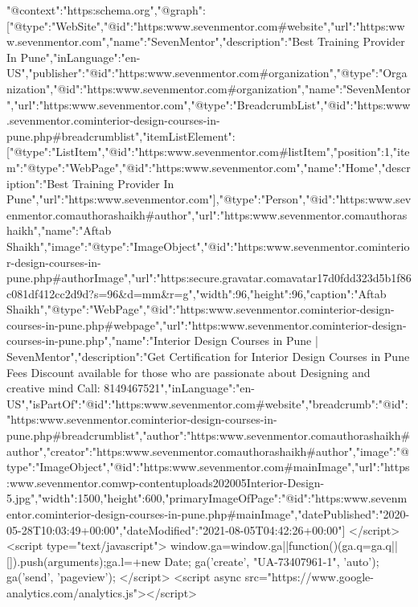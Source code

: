 			{"@context":"https:\/\/schema.org","@graph":[{"@type":"WebSite","@id":"https:\/\/www.sevenmentor.com\/#website","url":"https:\/\/www.sevenmentor.com\/","name":"SevenMentor","description":"Best Training Provider In Pune","inLanguage":"en-US","publisher":{"@id":"https:\/\/www.sevenmentor.com\/#organization"}},{"@type":"Organization","@id":"https:\/\/www.sevenmentor.com\/#organization","name":"SevenMentor","url":"https:\/\/www.sevenmentor.com\/"},{"@type":"BreadcrumbList","@id":"https:\/\/www.sevenmentor.com\/interior-design-courses-in-pune.php#breadcrumblist","itemListElement":[{"@type":"ListItem","@id":"https:\/\/www.sevenmentor.com\/#listItem","position":1,"item":{"@type":"WebPage","@id":"https:\/\/www.sevenmentor.com\/","name":"Home","description":"Best Training Provider In Pune","url":"https:\/\/www.sevenmentor.com\/"}}]},{"@type":"Person","@id":"https:\/\/www.sevenmentor.com\/author\/ashaikh#author","url":"https:\/\/www.sevenmentor.com\/author\/ashaikh","name":"Aftab Shaikh","image":{"@type":"ImageObject","@id":"https:\/\/www.sevenmentor.com\/interior-design-courses-in-pune.php#authorImage","url":"https:\/\/secure.gravatar.com\/avatar\/17d0fdd323d5b1f86c081df412cc2d9d?s=96&d=mm&r=g","width":96,"height":96,"caption":"Aftab Shaikh"}},{"@type":"WebPage","@id":"https:\/\/www.sevenmentor.com\/interior-design-courses-in-pune.php#webpage","url":"https:\/\/www.sevenmentor.com\/interior-design-courses-in-pune.php","name":"Interior Design Courses in Pune | SevenMentor","description":"Get Certification for Interior Design Courses in Pune Fees Discount available for those who are passionate about Designing and creative mind Call: 8149467521","inLanguage":"en-US","isPartOf":{"@id":"https:\/\/www.sevenmentor.com\/#website"},"breadcrumb":{"@id":"https:\/\/www.sevenmentor.com\/interior-design-courses-in-pune.php#breadcrumblist"},"author":"https:\/\/www.sevenmentor.com\/author\/ashaikh#author","creator":"https:\/\/www.sevenmentor.com\/author\/ashaikh#author","image":{"@type":"ImageObject","@id":"https:\/\/www.sevenmentor.com\/#mainImage","url":"https:\/\/www.sevenmentor.com\/wp-content\/uploads\/2020\/05\/Interior-Design-5.jpg","width":1500,"height":600},"primaryImageOfPage":{"@id":"https:\/\/www.sevenmentor.com\/interior-design-courses-in-pune.php#mainImage"},"datePublished":"2020-05-28T10:03:49+00:00","dateModified":"2021-08-05T04:42:26+00:00"}]}
		</script>
<script type="text/javascript">
			window.ga=window.ga||function(){(ga.q=ga.q||[]).push(arguments)};ga.l=+new Date;
			ga('create', "UA-73407961-1", 'auto');
			ga('send', 'pageview');
		</script>
<script async src="https://www.google-analytics.com/analytics.js"></script>

